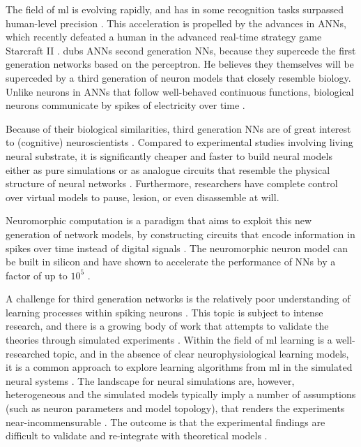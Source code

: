 

The field of \gls{ml} is evolving rapidly, and has in
some recognition tasks surpassed human-level precision
\autocite{Schmidhuber2014}.
This acceleration is propelled by the advances in \glspl{ANN}, 
which recently defeated a human in the
advanced real-time strategy game Starcraft II \cite{DeepMind2019}
\autocite{Schmidhuber2014, Nilsson2009, Russel2007}.
\citeauthor{Maass1997} dubs \glspl{ANN} second generation
\glspl{NN}, because they supercede the first generation networks
based on the perceptron.
He believes they themselves will be superceded by a third generation of neuron
models that closely resemble biology.
Unlike neurons in \glspl{ANN} that follow well-behaved continuous
functions, biological neurons communicate by spikes of
electricity over time
\cite{Maass1997}.

Because of their biological similarities, third generation 
\glspl{NN} are of great interest to (cognitive) neuroscientists
\autocite{Dayan2001,Bruderle2011,Eliasmith2015}.
Compared to experimental studies involving living neural substrate,
it is significantly cheaper and faster to build neural 
models either as pure simulations
\autocite{Davison2009, Eliasmith2015} or as analogue circuits
that resemble the physical structure of neural networks
\autocite{Walter2015, Schmitt2017}.
Furthermore, researchers have complete control over virtual models
to pause, lesion, or even disassemble at will.

Neuromorphic computation is a paradigm that aims to exploit this new
generation of network models, by constructing circuits that encode information
in spikes over time instead of digital signals \cite{Eliasmith2015, Albada2018}.
The neuromorphic neuron model can be built in
silicon and have shown to accelerate the performance of \glspl{NN}
by a factor of up to $10^5$ \cite{Albada2018, Schmitt2017}.

A challenge for third generation networks is the relatively
poor understanding of learning processes within spiking neurons \autocite{Tavanei2015,
Walter2015}.
This topic is subject to intense research, and there is a growing body of work
that attempts to validate the theories through simulated experiments 
\cite{Indiveri2015, Tavanaei2019}.
Within the field of \gls{ml} learning is a well-researched topic, and in the
absence of clear neurophysiological learning models, it is a common approach to 
explore learning algorithms from \gls{ml} in the simulated neural systems
\cite{Lee2016,Schmitt2017,Walter2015,Diehl2015,Rueckauer2017}.
The landscape for neural simulations are, however, heterogeneous and the
simulated models typically imply a number of assumptions (such as neuron
parameters and model topology), that renders the experiments near-incommensurable
\cite{Albada2018, Lee2016, Rueckauer2017}.
The outcome is that the experimental findings are difficult to validate
and re-integrate with theoretical models \autocite{Rueckauer2017, Albada2018,
Bruderle2011}.

